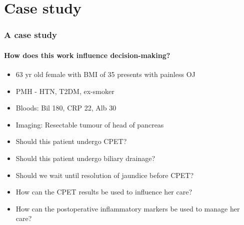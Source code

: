 \documentclass[10pt]{beamer}
\begin{document}
\section{Case study}
\begin{frame}
	\frametitle{A case study}
	\framesubtitle{How does this work influence decision-making?}
	\begin{itemize}
		\item 63 yr old female with BMI of 35 presents with painless OJ
		\item PMH - HTN, T2DM, ex-smoker
		\item Bloods: Bil 180, CRP 22, Alb 30
		\item Imaging: Resectable tumour of head of pancreas
		\medskip
		
		\item Should this patient undergo CPET?
		\item Should this patient undergo biliary drainage?
		\item Should we wait until resolution of jaundice before CPET?
		\item How can the CPET results be used to influence her care?
		\item How can the postoperative inflammatory markers be used to manage her care?
	\end{itemize}
\end{frame}
\end{document}

